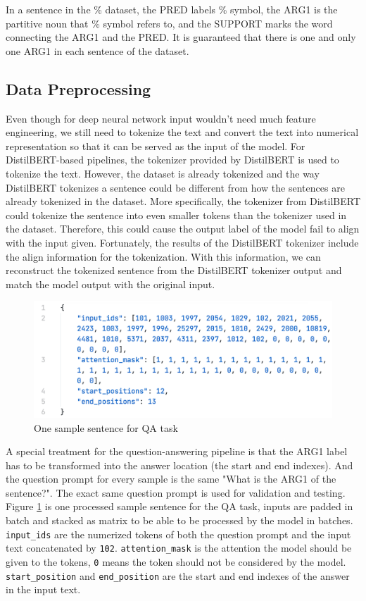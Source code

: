 \documentclass[11pt]{article}
\begin{document}
In a sentence in the \% dataset, the PRED labels \% symbol, the ARG1 is the partitive noun that \% symbol refers to, and the SUPPORT marks the word connecting the ARG1 and the PRED. It is guaranteed that there is one and only one ARG1 in each sentence of the dataset.

\subsection{Data Preprocessing}
\label{section:data-preprocessing}

Even though for deep neural network input wouldn't need much feature engineering, we still need to tokenize the text and convert the text into numerical representation so that it can be served as the input of the model. For DistilBERT-based pipelines, the tokenizer provided by DistilBERT is used to tokenize the text. However, the dataset is already tokenized and the way DistilBERT tokenizes a sentence could be different from how the sentences are already tokenized in the dataset. More specifically, the tokenizer from DistilBERT could tokenize the sentence into even smaller tokens than the tokenizer used in the dataset. Therefore, this could cause the output label of the model fail to align with the input given. Fortunately, the results of the DistilBERT tokenizer include the align information for the tokenization. With this information, we can reconstruct the tokenized sentence from the DistilBERT tokenizer output and match the model output with the original input.

\begin{figure}[h]
  \centering
  \includegraphics[width=\linewidth]{assets/dataset-one-qa-sample.png}
  \caption{One sample sentence for QA task}
  \label{fig:dataset-one-qa-sample}
\end{figure}

A special treatment for the question-answering pipeline is that the ARG1 label has to be transformed into the answer location (the start and end indexes). And the question prompt for every sample is the same "What is the ARG1 of the sentence?". The exact same question prompt is used for validation and testing. Figure \ref{fig:dataset-one-qa-sample} is one processed sample sentence for the QA task, inputs are padded in batch and stacked as matrix to be able to be processed by the model in batches. \verb|input_ids| are the numerized tokens of both the question prompt and the input text concatenated by \verb|102|. \verb|attention_mask| is the attention the model should be given to the tokens, \verb|0| means the token should not be considered by the model. \verb|start_position| and \verb|end_position| are the start and end indexes of the answer in the input text.
\end{document}
